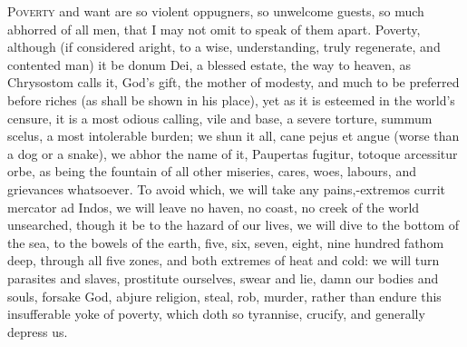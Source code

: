{\lettrine{P}{overty} and want are so violent oppugners, so unwelcome guests, so much
abhorred of all men, that I may not omit to speak of them apart.
Poverty, although (if considered aright, to a wise, understanding,
truly regenerate, and contented man) it be donum Dei, a blessed estate,
the way to heaven, as Chrysostom calls it, God's gift, the mother
of modesty, and much to be preferred before riches (as shall be shown
in his place), yet as it is esteemed in the world's censure, it
is a most odious calling, vile and base, a severe torture, summum
scelus, a most intolerable burden; we shun it all, cane pejus et
angue (worse than a dog or a snake), we abhor the name of it,
Paupertas fugitur, totoque arcessitur orbe, as being the fountain
of all other miseries, cares, woes, labours, and grievances whatsoever.
To avoid which, we will take any pains,-extremos currit mercator ad
Indos, we will leave no haven, no coast, no creek of the world
unsearched, though it be to the hazard of our lives, we will dive to
the bottom of the sea, to the bowels of the earth, five, six,
seven, eight, nine hundred fathom deep, through all five zones, and
both extremes of heat and cold: we will turn parasites and slaves,
prostitute ourselves, swear and lie, damn our bodies and souls, forsake
God, abjure religion, steal, rob, murder, rather than endure this
insufferable yoke of poverty, which doth so tyrannise, crucify, and
generally depress us.

}

